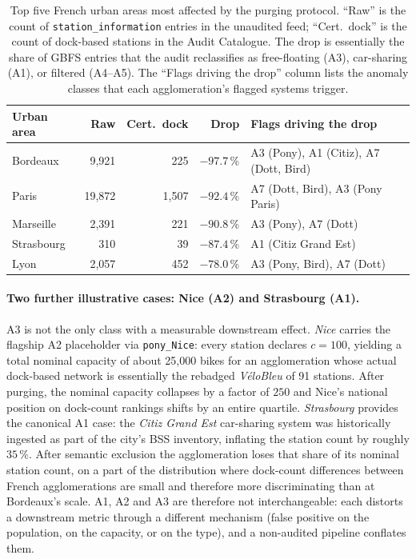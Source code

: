 \documentclass[11pt,a4paper]{article}
\begin{document}
\begin{table}[ht]
\centering
\caption{Top five French urban areas most affected by the purging
protocol. ``Raw'' is the count of \texttt{station\_information}
entries in the unaudited feed; ``Cert.\ dock'' is the count of
dock-based stations in the Audit Catalogue. The drop is essentially
the share of GBFS entries that the audit reclassifies as
free-floating (A3), car-sharing (A1), or filtered (A4--A5). The
``Flags driving the drop'' column lists the anomaly classes that
each agglomeration's flagged systems trigger.}
\label{tab:top5-reranks}
\small
\begin{tabular}{@{}lrrrl@{}}
\toprule
\textbf{Urban area} & \textbf{Raw} & \textbf{Cert.\ dock}
                    & \textbf{Drop} & \textbf{Flags driving the drop}\\
\midrule
Bordeaux         & 9{,}921 & 225   & $-97.7\,\%$
                 & A3 (Pony), A1 (Citiz), A7 (Dott, Bird) \\
Paris            & 19{,}872 & 1{,}507 & $-92.4\,\%$
                 & A7 (Dott, Bird), A3 (Pony Paris) \\
Marseille        & 2{,}391 & 221   & $-90.8\,\%$
                 & A3 (Pony), A7 (Dott) \\
Strasbourg       & 310     & 39    & $-87.4\,\%$
                 & A1 (Citiz Grand Est) \\
Lyon             & 2{,}057 & 452   & $-78.0\,\%$
                 & A3 (Pony, Bird), A7 (Dott) \\
\bottomrule
\end{tabular}
\end{table}

\paragraph{Two further illustrative cases: Nice (A2) and Strasbourg (A1).}
A3 is not the only class with a measurable downstream effect.
\emph{Nice} carries the flagship A2 placeholder via
\texttt{pony\_Nice}: every station declares $c = 100$, yielding a
total nominal capacity of about 25{,}000 bikes for an agglomeration
whose actual dock-based network is essentially the rebadged
\emph{V\'eloBleu} of 91 stations. After purging, the nominal
capacity collapses by a factor of $250$ and Nice's national
position on dock-count rankings shifts by an entire quartile.
\emph{Strasbourg} provides the canonical A1 case: the
\emph{Citiz Grand Est} car-sharing system was historically
ingested as part of the city's BSS inventory, inflating the
station count by roughly $35\,\%$. After semantic exclusion the
agglomeration loses that share of its nominal station count, on
a part of the distribution where dock-count differences between
French agglomerations are small and therefore more discriminating
than at Bordeaux's scale. A1, A2 and A3 are therefore not
interchangeable: each distorts a downstream metric through a
different mechanism (false positive on the population, on the
capacity, or on the type), and a non-audited pipeline conflates
them.
\end{document}
